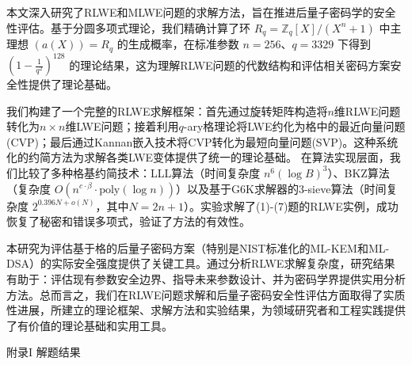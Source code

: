 \documentclass[12pt,a4paper]{article}
\numberwithin{equation}{section}
\begin{document}





本文深入研究了RLWE和MLWE问题的求解方法，旨在推进后量子密码学的安全性评估。基于分圆多项式理论，我们精确计算了环 $R_q = \mathbb{Z}_q[X]/(X^n + 1)$ 中主理想 $(a(X)) = R_q$ 的生成概率，在标准参数 $n = 256$、$q = 3329$ 下得到 $(1-\frac{1}{q^2})^{128}$ 的理论结果，这为理解RLWE问题的代数结构和评估相关密码方案安全性提供了理论基础。

我们构建了一个完整的RLWE求解框架：首先通过旋转矩阵构造将$n$维RLWE问题转化为$n \times n$维LWE问题；接着利用$q$-ary格理论将LWE约化为格中的最近向量问题(CVP)；最后通过Kannan嵌入技术将CVP转化为最短向量问题(SVP)。这种系统化的约简方法为求解各类LWE变体提供了统一的理论基础。
在算法实现层面，我们比较了多种格基约简技术：LLL算法（时间复杂度 $n^6 (\log B)^3$）、BKZ算法（复杂度 $O(n^{c \cdot \beta} \cdot \text{poly}(\log n))$）以及基于G6K求解器的3-sieve算法（时间复杂度 $2^{0.396N+o(N)}$，其中$N=2n+1$）。实验求解了(1)-(7)题的RLWE实例，成功恢复了秘密和错误多项式，验证了方法的有效性。

本研究为评估基于格的后量子密码方案（特别是NIST标准化的ML-KEM和ML-DSA）的实际安全强度提供了关键工具。通过分析RLWE求解复杂度，研究结果有助于：评估现有参数安全边界、指导未来参数设计、并为密码学界提供实用分析方法。总而言之，我们在RLWE问题求解和后量子密码安全性评估方面取得了实质性进展，所建立的理论框架、求解方法和实验结果，为领域研究者和工程实践提供了有价值的理论基础和实用工具。

\hspace*{\fill}

{\centering\heiti\fontsize{14pt}{21pt}\selectfont 附录I \; 解题结果\par}
\vspace{1em}
\end{document}
